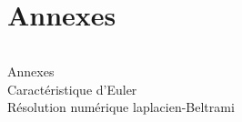 \chapter{Annexes}
\label{chap:annexes}
\minitoc

\[\]

Annexes\\
Caractéristique d'Euler\\
Résolution numérique laplacien-Beltrami\\
